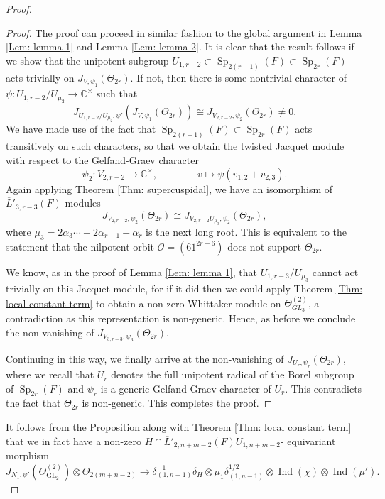 \documentclass[11pt,reqno]{amsart}
\theoremstyle{definition}
\theoremstyle{remark}
\theoremstyle{definition}
\begin{document}
\begin{proof}
\begin{proof}
The proof can proceed in similar fashion to the global argument in Lemma \ref{Lem: lemma 1} and Lemma \ref{Lem: lemma 2}. It is clear that the result follows if we show that the unipotent subgroup $U_{1,r-2}\subset \operatorname{Sp}_{2(r-1)}(F)\subset \operatorname{Sp}_{2r}(F)$ acts trivially on $ J_{V,\psi_1}(\Theta_{2r})$.  If not, then there is some nontrivial character of $\psi:  U_{1,r-2}/U_{\mu_2}\to {\mathbb C}^\times$ such that 
\[
J_{U_{1,r-2}/U_{\mu_2}, \psi'}(J_{V,\psi_1}(\Theta_{2r}))\cong J_{V_{2,r-2},\psi_2}(\Theta_{2r}) \neq0.
\]
We have made use of the fact that $\operatorname{Sp}_{2(r-1)}(F)\subset \operatorname{Sp}_{2r}(F)$ acts transitively on such characters, so that we obtain the twisted Jacquet module with respect to the Gelfand-Graev character 
\[
\psi_2: V_{2,r-2}\to {\mathbb C}^\times, \qquad\qquad v\mapsto \psi(v_{1,2}+v_{2,3}).
\]
Again applying Theorem \ref{Thm: supercuspidal}, we have an isomorphism of $\overline{L}'_{3,r-3}(F)$-modules
\[
J_{V_{2,r-2},\psi_2}(\Theta_{2r})\cong J_{V_{2,r-2}U_{\mu_3},\psi_2}(\Theta_{2r}),
\]
where $\mu_3=2{\alpha}_3\cdots +2{\alpha}_{r-1}+{\alpha}_r$ is the next long root. This is equivalent to the statement that the nilpotent orbit ${\mathcal{O}}= (61^{2r-6})$ does not support $\Theta_{2r}$.

We know, as in the proof of Lemma \ref{Lem: lemma 1}, that $U_{1,r-3}/U_{\mu_3}$ cannot act trivially on this Jacquet module, for if it did then we could apply Theorem \ref{Thm: local constant term} to obtain a non-zero Whittaker module on $\Theta_{GL_3}^{(2)}$, a contradiction as this representation is non-generic. Hence, as before we conclude the non-vanishing of $J_{V_{3,r-3},\psi_3}(\Theta_{2r}).$

Continuing in this way, we finally arrive at the non-vanishing of $J_{U_r, \psi_r}(\Theta_{2r})$, where we recall that $U_r$ denotes the full unipotent radical of the Borel subgroup of $\operatorname{Sp}_{2r}(F)$ and $\psi_r$ is a generic Gelfand-Graev character of $U_r$. This contradicts the fact that $\Theta_{2r}$ is non-generic. This completes the proof.
\end{proof}
It follows from the Proposition along with Theorem \ref{Thm: local constant term} that we in fact have a non-zero $H\cap\overline{L}'_{2,n+m-2}(F)U_{1,n+m-2}$- equivariant morphism
\[
J_{N_1,\psi'}(\Theta_{\operatorname{GL}_2}^{(2)})\otimes\Theta_{2(m+n-2)}\longrightarrow\delta^{-1}_{(1,n-1)}\delta_{H}\otimes \mu_1\delta_{(1,n-1)}^{1/2}\otimes\operatorname{Ind}(\chi)\otimes\operatorname{Ind}(\mu').
\]


\end{proof}
\end{document}
